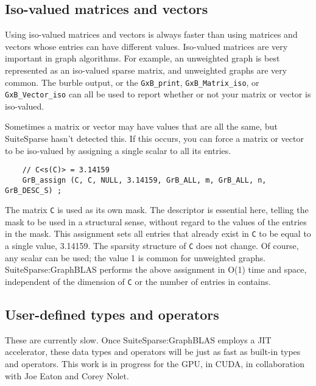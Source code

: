 \documentclass[12pt]{article}
\begin{document}
\subsection{Iso-valued matrices and vectors}

Using iso-valued matrices and vectors is always faster than using matrices and
vectors whose entries can have different values.  Iso-valued matrices are very
important in graph algorithms.  For example, an unweighted graph is best
represented as an iso-valued sparse matrix, and unweighted graphs are very
common.  The burble output, or the \verb'GxB_print', \verb'GxB_Matrix_iso', or
\verb'GxB_Vector_iso' can all be used to report whether or not your matrix or
vector is iso-valued.

Sometimes a matrix or vector may have values that are all the same, but
SuiteSparse hasn't detected this.  If this occurs, you can force a matrix
or vector to be iso-valued by assigning a single scalar to all its entries.

    {\scriptsize
    \begin{verbatim}
    // C<s(C)> = 3.14159
    GrB_assign (C, C, NULL, 3.14159, GrB_ALL, m, GrB_ALL, n, GrB_DESC_S) ; \end{verbatim}}

The matrix \verb'C' is used as its own mask.  The descriptor is essential here,
telling the mask to be used in a structural sense, without regard to the values
of the entries in the mask.  This assignment sets all entries that already
exist in \verb'C' to be equal to a single value, 3.14159. The sparsity
structure of \verb'C' does not change.  Of course, any scalar can be used; the
value 1 is common for unweighted graphs.  SuiteSparse:GraphBLAS performs the
above assignment in O(1) time and space, independent of the dimension of
\verb'C' or the number of entries in contains.

\subsection{User-defined types and operators}

These are currently slow.  Once SuiteSparse:GraphBLAS employs a JIT
accelerator, these data types and operators will be just as fast as built-in
types and operators.  This work is in progress for the GPU, in CUDA, in
collaboration with Joe Eaton and Corey Nolet.
\end{document}
